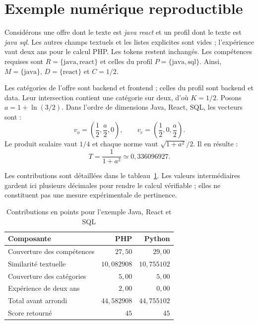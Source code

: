 \section{Exemple numérique reproductible}

Considérons une offre dont le texte est \emph{java react} et un profil dont le texte est \emph{java sql}. Les autres champs textuels et les listes explicites sont vides ; l'expérience vaut deux ans pour le calcul PHP. Les tokens restent inchangés. Les compétences requises sont $R=\{\text{java},\text{react}\}$ et celles du profil $P=\{\text{java},\text{sql}\}$. Ainsi, $M=\{\text{java}\}$, $D=\{\text{react}\}$ et $C=1/2$.

Les catégories de l'offre sont backend et frontend ; celles du profil sont backend et data. Leur intersection contient une catégorie sur deux, d'où $K=1/2$. Posons $a=1+\ln(3/2)$. Dans l'ordre de dimensions Java, React, SQL, les vecteurs sont :
\begin{equation}
v_o=\left(\frac{1}{2},\frac{a}{2},0\right),
\qquad
v_c=\left(\frac{1}{2},0,\frac{a}{2}\right).
\end{equation}
Le produit scalaire vaut $1/4$ et chaque norme vaut $\sqrt{1+a^2}/2$. Il en résulte :
\begin{equation}
T=\frac{1}{1+a^2}\simeq 0{,}336096927.
\end{equation}

Les contributions sont détaillées dans le tableau~\ref{tab:exemple-score}. Les valeurs intermédiaires gardent ici plusieurs décimales pour rendre le calcul vérifiable ; elles ne constituent pas une mesure expérimentale de pertinence.

\begin{table}[htbp]
\centering
\caption{Contributions en points pour l'exemple Java, React et SQL}
\label{tab:exemple-score}
\begin{tabular}{@{}lrr@{}}
\toprule
Composante & PHP & Python \\
\midrule
Couverture des compétences & $27{,}50$ & $29{,}00$ \\
Similarité textuelle & $10{,}082908$ & $10{,}755102$ \\
Couverture des catégories & $5{,}00$ & $5{,}00$ \\
Expérience de deux ans & $2{,}00$ & $0{,}00$ \\
\midrule
Total avant arrondi & $44{,}582908$ & $44{,}755102$ \\
Score retourné & $45$ & $45$ \\
\bottomrule
\end{tabular}
\end{table}

